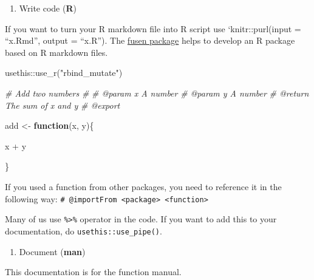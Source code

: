 \documentclass[
]{book}
\newenvironment{Shaded}{\begin{snugshade}}{\end{snugshade}}
\newcommand{\CommentTok}[1]{\textcolor[rgb]{0.56,0.35,0.01}{\textit{#1}}}
\newcommand{\ControlFlowTok}[1]{\textcolor[rgb]{0.13,0.29,0.53}{\textbf{#1}}}
\newcommand{\FunctionTok}[1]{\textcolor[rgb]{0.00,0.00,0.00}{#1}}
\newcommand{\NormalTok}[1]{#1}
\newcommand{\OtherTok}[1]{\textcolor[rgb]{0.56,0.35,0.01}{#1}}
\newcommand{\SpecialCharTok}[1]{\textcolor[rgb]{0.00,0.00,0.00}{#1}}
\newcommand{\StringTok}[1]{\textcolor[rgb]{0.31,0.60,0.02}{#1}}
\providecommand{\tightlist}{%
  \setlength{\itemsep}{0pt}\setlength{\parskip}{0pt}}
\begin{document}
\begin{enumerate}
\def\labelenumi{\arabic{enumi}.}
\setcounter{enumi}{1}
\tightlist
\item
  Write code (\textbf{R})
\end{enumerate}

If you want to turn your R markdown file into R script use `knitr::purl(input = ``x.Rmd'',
output = ``x.R''). The \href{https://thinkr-open.github.io/fusen/}{fusen package} helps to develop an R package based on R markdown files.

\begin{Shaded}
\begin{Highlighting}[]
\NormalTok{usethis}\SpecialCharTok{::}\FunctionTok{use\_r}\NormalTok{(}\StringTok{"rbind\_mutate"}\NormalTok{)}
\end{Highlighting}
\end{Shaded}

\begin{Shaded}
\begin{Highlighting}[]
\CommentTok{\#\textquotesingle{} Add two numbers}
\CommentTok{\#\textquotesingle{}}
\CommentTok{\#\textquotesingle{} @param x A number}
\CommentTok{\#\textquotesingle{} @param y A number}
\CommentTok{\#\textquotesingle{} @return The sum of x and y }
\CommentTok{\#\textquotesingle{} @export}

\NormalTok{add }\OtherTok{\textless{}{-}} \ControlFlowTok{function}\NormalTok{(x, y)\{}
  
\NormalTok{  x }\SpecialCharTok{+}\NormalTok{ y}
  
\NormalTok{\}}
\end{Highlighting}
\end{Shaded}

If you used a function from other packages, you need to reference it in the following way: \texttt{\#\textquotesingle{}\ @importFrom\ \textless{}package\textgreater{}\ \textless{}function\textgreater{}}

Many of us use \texttt{\%\textgreater{}\%} operator in the code. If you want to add this to your documentation, do \texttt{usethis::use\_pipe()}.

\begin{enumerate}
\def\labelenumi{\arabic{enumi}.}
\setcounter{enumi}{2}
\tightlist
\item
  Document (\textbf{man})
\end{enumerate}

This documentation is for the function manual.
\end{document}
